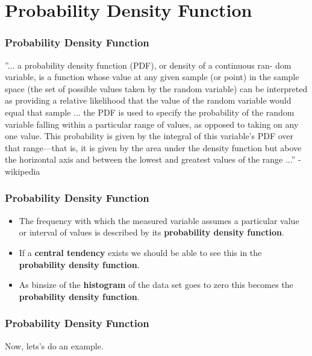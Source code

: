 \documentclass[fleqn]{beamer} %
\newcommand{\sectiontitleIV}{Probability Density Function}
\begin{document}
\section{\sectiontitleIV}	
	\begin{frame}[label=sectionIV] \small
		\frametitle{\sectiontitleIV}    

”... a {\BL probability density function (PDF)}, or density of a continuous ran-
dom variable, is a function whose value at any given sample (or point) in
the sample space (the set of possible values taken by the random variable)
can be interpreted as providing a relative likelihood that the value of the
random variable would equal that sample ... the PDF is used to specify
the probability of the random variable falling within a particular range of
values, as opposed to taking on any one value. This probability is given
by the integral of this variable’s PDF over that range—that is, it is given
by the area under the density function but above the horizontal axis and
between the lowest and greatest values of the range ...” - wikipedia

	\end{frame}
	
	\begin{frame}[label=sectionIV] \small
		\frametitle{\sectiontitleIV}    

			\begin{itemize}
			\item  The frequency with which the measured variable assumes a particular value or interval of values is described by its {\bf \BL probability density function}. \\

            \item  If a {\bf \PR central tendency} exists we should be able to see this in the {\bf \BL probability density function}. \\
                               
            \item  As binsize of the {\bf \GR histogram} of the data set goes to zero this becomes the {\bf \BL probability density function}. \\ 
                                
		\end{itemize}

	\end{frame}

	\begin{frame}[label=sectionIV] \small
		\frametitle{\sectiontitleIV}    
Now, lets's do an example.

	\end{frame}
\end{document}

